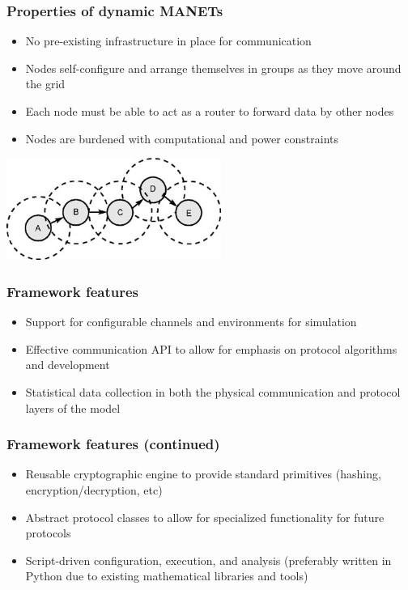 \documentclass[handout]{beamer}
\begin{document}
\begin{frame}
 \frametitle{Properties of dynamic MANETs}
 \begin{itemize}
  \item No pre-existing infrastructure in place for communication
  \item Nodes self-configure and arrange themselves in groups as they move around the grid
  \item Each node must be able to act as a router to forward data by other nodes
  \item Nodes are burdened with computational and power constraints
 \end{itemize}
 \begin{center}
  \includegraphics[width=70mm]{groups.jpg}
 \end{center}
\end{frame}

\begin{frame}
 \frametitle{Framework features}
 \begin{itemize}
  \item Support for configurable channels and environments for simulation
  \item Effective communication API to allow for emphasis on protocol algorithms and development
  \item Statistical data collection in both the physical communication and protocol layers of the model
 \end{itemize}
\end{frame}

\begin{frame}
 \frametitle{Framework features (continued)}
 \begin{itemize}
  \item Reusable cryptographic engine to provide standard primitives (hashing, encryption/decryption, etc)
  \item Abstract protocol classes to allow for specialized functionality for future protocols
  \item Script-driven configuration, execution, and analysis (preferably written in Python due to existing mathematical libraries and tools)
 \end{itemize}
\end{frame}
\end{document}
